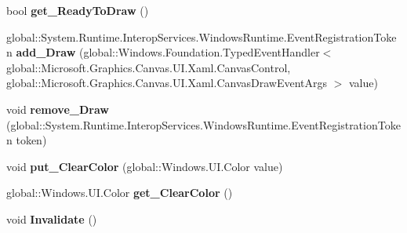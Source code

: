 \begin{DoxyCompactItemize}
\item 
\mbox{\label{class_microsoft_1_1_graphics_1_1_canvas_1_1_u_i_1_1_xaml_1_1_canvas_control_a8c352fee2e45098d724d65a687a38126}} 
bool {\bfseries get\+\_\+\+Ready\+To\+Draw} ()
\item 
\mbox{\label{class_microsoft_1_1_graphics_1_1_canvas_1_1_u_i_1_1_xaml_1_1_canvas_control_a733ea4b79b9f0c15e8be4a4701c50a33}} 
global\+::\+System.\+Runtime.\+Interop\+Services.\+Windows\+Runtime.\+Event\+Registration\+Token {\bfseries add\+\_\+\+Draw} (global\+::\+Windows.\+Foundation.\+Typed\+Event\+Handler$<$ global\+::\+Microsoft.\+Graphics.\+Canvas.\+U\+I.\+Xaml.\+Canvas\+Control, global\+::\+Microsoft.\+Graphics.\+Canvas.\+U\+I.\+Xaml.\+Canvas\+Draw\+Event\+Args $>$ value)
\item 
\mbox{\label{class_microsoft_1_1_graphics_1_1_canvas_1_1_u_i_1_1_xaml_1_1_canvas_control_ad2a843f823ae97fdab81ae2b2e2564fa}} 
void {\bfseries remove\+\_\+\+Draw} (global\+::\+System.\+Runtime.\+Interop\+Services.\+Windows\+Runtime.\+Event\+Registration\+Token token)
\item 
\mbox{\label{class_microsoft_1_1_graphics_1_1_canvas_1_1_u_i_1_1_xaml_1_1_canvas_control_ac45e4aa28ab4d2147741f75260781cfa}} 
void {\bfseries put\+\_\+\+Clear\+Color} (global\+::\+Windows.\+U\+I.\+Color value)
\item 
\mbox{\label{class_microsoft_1_1_graphics_1_1_canvas_1_1_u_i_1_1_xaml_1_1_canvas_control_ac1780376dd163f47f7d16e7470b4e96f}} 
global\+::\+Windows.\+U\+I.\+Color {\bfseries get\+\_\+\+Clear\+Color} ()
\item 
\mbox{\label{class_microsoft_1_1_graphics_1_1_canvas_1_1_u_i_1_1_xaml_1_1_canvas_control_a4676af3dd8e8a8a5bedabb4a172949db}} 
void {\bfseries Invalidate} ()
\item 
\mbox{\label{class_microsoft_1_1_graphics_1_1_canvas_1_1_u_i_1_1_xaml_1_1_canvas_control_a49e67369dc1fe3f019a64f6fdd0342cb}} 

\end{DoxyCompactItemize}
